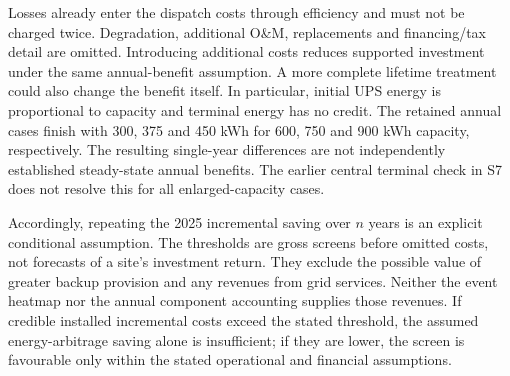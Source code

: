 Losses already enter the dispatch costs through efficiency and must not be charged twice. Degradation, additional O\&M, replacements and financing/tax detail are omitted. Introducing additional costs reduces supported investment under the same annual-benefit assumption. A more complete lifetime treatment could also change the benefit itself. In particular, initial UPS energy is proportional to capacity and terminal energy has no credit. The retained annual cases finish with 300, 375 and 450 kWh for 600, 750 and 900 kWh capacity, respectively. The resulting single-year differences are not independently established steady-state annual benefits. The earlier central terminal check in S7 does not resolve this for all enlarged-capacity cases.

Accordingly, repeating the 2025 incremental saving over $n$ years is an explicit conditional assumption. The thresholds are gross screens before omitted costs, not forecasts of a site's investment return. They exclude the possible value of greater backup provision and any revenues from grid services. Neither the event heatmap nor the annual component accounting supplies those revenues. If credible installed incremental costs exceed the stated threshold, the assumed energy-arbitrage saving alone is insufficient; if they are lower, the screen is favourable only within the stated operational and financial assumptions.
